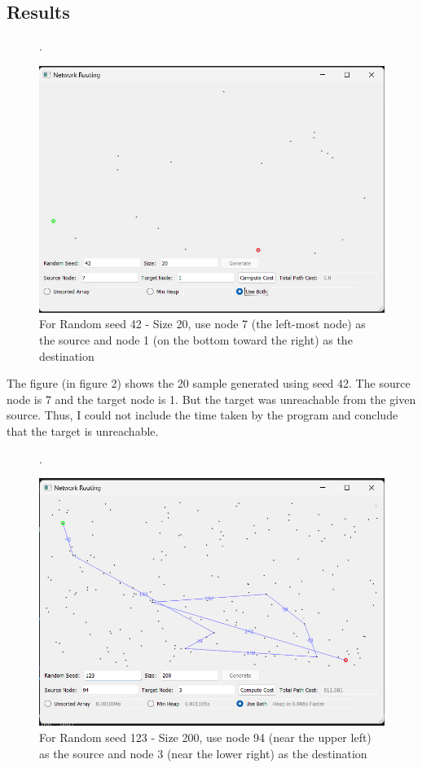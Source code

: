 \documentclass[12pt]{article}
\begin{document}
  \newpage

\subsection{Results}
\begin{figure}[h]. %
    \begin{center}
      \includegraphics[width=0.80\linewidth]{figures/42.png} 
      \caption{For Random seed 42 - Size 20, use node 7 (the left-most node) as the source and node 1 (on the bottom toward the right) as the destination}\label{fig:42}
    \end{center}
  \end{figure}

\noindent The figure (in figure 2) shows the 20 sample generated using seed 42. The source node is 7 and the target node is 1. But the target was unreachable from the given source. Thus, I could not include the time taken by the program and conclude that the target is unreachable. 
\newpage

\begin{figure}[h]. %
    \begin{center}
      \includegraphics[width=0.80\linewidth]{figures/943.png} 
      \caption{For Random seed 123 - Size 200, use node 94 (near the upper left) as the source and node 3 (near the lower right) as the destination}\label{fig:943}
    \end{center}
  \end{figure}
\end{document}
